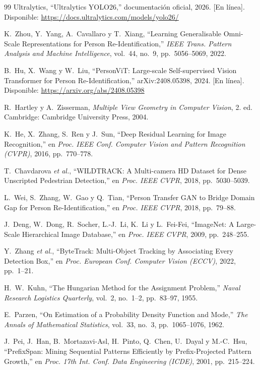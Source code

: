 \documentclass[12pt,a4paper]{article}
\begin{document}
\begin{thebibliography}{99}
Ultralytics, ``Ultralytics YOLO26,'' documentación oficial, 2026. [En
línea]. Disponible: \url{https://docs.ultralytics.com/models/yolo26/}

K.~Zhou, Y.~Yang, A.~Cavallaro y T.~Xiang, ``Learning Generalisable
Omni-Scale Representations for Person Re-Identification,'' \textit{IEEE
Trans. Pattern Analysis and Machine Intelligence}, vol.~44, no.~9,
pp.~5056--5069, 2022.

B.~Hu, X.~Wang y W.~Liu, ``PersonViT: Large-scale Self-supervised Vision
Transformer for Person Re-Identification,'' arXiv:2408.05398, 2024. [En
línea]. Disponible: \url{https://arxiv.org/abs/2408.05398}

R.~Hartley y A.~Zisserman, \textit{Multiple View Geometry in Computer
Vision}, 2.\textordfeminine{} ed. Cambridge: Cambridge University Press,
2004.

K.~He, X.~Zhang, S.~Ren y J.~Sun, ``Deep Residual Learning for Image
Recognition,'' en \textit{Proc. IEEE Conf. Computer Vision and Pattern
Recognition (CVPR)}, 2016, pp.~770--778.

T.~Chavdarova \textit{et al.}, ``WILDTRACK: A Multi-camera HD Dataset for Dense
Unscripted Pedestrian Detection,'' en \textit{Proc. IEEE CVPR}, 2018,
pp.~5030--5039.

L.~Wei, S.~Zhang, W.~Gao y Q.~Tian, ``Person Transfer GAN to Bridge Domain
Gap for Person Re-Identification,'' en \textit{Proc. IEEE CVPR}, 2018,
pp.~79--88.

J.~Deng, W.~Dong, R.~Socher, L.-J.~Li, K.~Li y L.~Fei-Fei, ``ImageNet: A
Large-Scale Hierarchical Image Database,'' en \textit{Proc. IEEE CVPR},
2009, pp.~248--255.

Y.~Zhang \textit{et al.}, ``ByteTrack: Multi-Object Tracking by Associating
Every Detection Box,'' en \textit{Proc. European Conf. Computer Vision
(ECCV)}, 2022, pp.~1--21.

H.~W.~Kuhn, ``The Hungarian Method for the Assignment Problem,''
\textit{Naval Research Logistics Quarterly}, vol.~2, no.~1--2,
pp.~83--97, 1955.

E.~Parzen, ``On Estimation of a Probability Density Function and Mode,''
\textit{The Annals of Mathematical Statistics}, vol.~33, no.~3,
pp.~1065--1076, 1962.

J.~Pei, J.~Han, B.~Mortazavi-Asl, H.~Pinto, Q.~Chen, U.~Dayal y
M.-C.~Hsu, ``PrefixSpan: Mining Sequential Patterns Efficiently by
Prefix-Projected Pattern Growth,'' en \textit{Proc. 17th Int. Conf. Data
Engineering (ICDE)}, 2001, pp.~215--224.


\end{thebibliography}
\end{document}
